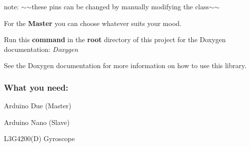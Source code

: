 note\+: $\sim$$\sim$these pins can be changed by manually modifying the class$\sim$$\sim$

For the {\bfseries Master} you can choose whatever suits your mood.

Run this {\bfseries command} in the {\bfseries root} directory of this project for the Doxygen documentation\+: {\itshape Doxygen}

See the Doxygen documentation for more information on how to use this library.

\subsubsection*{What you need\+:}


\begin{DoxyItemize}
\item Arduino Due (Master)
\item Arduino Nano (Slave)
\item L3\+G4200(\+D) Gyroscope 
\end{DoxyItemize}